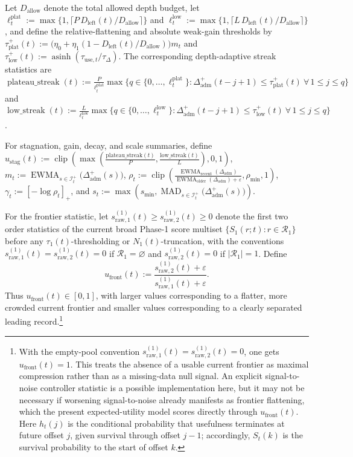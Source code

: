 \documentclass[11pt]{article}
\begin{document}
Let \(D_{\mathrm{allow}}\) denote the total allowed depth budget, let \(\ell_t^{\mathrm{plat}}:=\max\{1,\lceil P\,D_{\mathrm{left}}(t)/D_{\mathrm{allow}}\rceil\}\) and \(\ell_t^{\mathrm{low}}:=\max\{1,\lceil L\,D_{\mathrm{left}}(t)/D_{\mathrm{allow}}\rceil\}\), and define the relative-flattening and absolute weak-gain thresholds by \(\tau_{\mathrm{plat}}^{+}(t):=\bigl(\eta_0+\eta_1(1-D_{\mathrm{left}}(t)/D_{\mathrm{allow}})\bigr)m_t\) and \(\tau_{\mathrm{low}}^{+}(t):=\operatorname{asinh}(\tau_{\mathrm{use},t}/\tau_\Delta)\). The corresponding depth-adaptive streak statistics are \(\operatorname{plateau\_streak}(t):=\frac{P}{\ell_t^{\mathrm{plat}}}\max\{q\in\{0,\dots,\ell_t^{\mathrm{plat}}\}:\Delta_{\mathrm{adm}}^{+}(t-j+1)\le \tau_{\mathrm{plat}}^{+}(t)\ \forall\,1\le j\le q\}\) and \(\operatorname{low\_streak}(t):=\frac{L}{\ell_t^{\mathrm{low}}}\max\{q\in\{0,\dots,\ell_t^{\mathrm{low}}\}:\Delta_{\mathrm{adm}}^{+}(t-j+1)\le \tau_{\mathrm{low}}^{+}(t)\ \forall\,1\le j\le q\}\).

For stagnation, gain, decay, and scale summaries, define \(u_{\mathrm{stag}}(t):=\operatorname{clip}\!\left(\max\!\left(\frac{\mathrm{plateau\_streak}(t)}{P},\frac{\mathrm{low\_streak}(t)}{L}\right),0,1\right)\), \(m_t:=\operatorname{EWMA}_{s\in\mathcal I_t^+}\!\bigl(\Delta_{\mathrm{adm}}^{+}(s)\bigr)\), \(\rho_t:=\operatorname{clip}\!\left(\frac{\operatorname{EWMA}_{\mathrm{recent}}(\Delta_{\mathrm{adm}})}{\operatorname{EWMA}_{\mathrm{older}}(\Delta_{\mathrm{adm}})+\varepsilon},\rho_{\min},1\right)\), \(\gamma_t:=[-\log\rho_t]_+\), and \(s_t:=\max\!\left(s_{\min},\operatorname{MAD}_{s\in\mathcal I_t^+}\!\bigl(\Delta_{\mathrm{adm}}^{+}(s)\bigr)\right)\).

For the frontier statistic, let \(s_{\mathrm{raw},1}^{(1)}(t)\ge s_{\mathrm{raw},2}^{(1)}(t)\ge 0\) denote the first two order statistics of the current broad Phase-1 score multiset \(\{S_1(r;t):r\in\mathcal R_1\}\) before any \(\tau_1(t)\)-thresholding or \(N_1(t)\)-truncation, with the conventions \(s_{\mathrm{raw},1}^{(1)}(t)=s_{\mathrm{raw},2}^{(1)}(t)=0\) if \(\mathcal R_1=\varnothing\) and \(s_{\mathrm{raw},2}^{(1)}(t)=0\) if \(|\mathcal R_1|=1\). Define
\[
u_{\mathrm{front}}(t)
:=
\frac{s_{\mathrm{raw},2}^{(1)}(t)+\varepsilon}{s_{\mathrm{raw},1}^{(1)}(t)+\varepsilon}.
\]
Thus \(u_{\mathrm{front}}(t)\in[0,1]\), with larger values corresponding to a flatter, more crowded current frontier and smaller values corresponding to a clearly separated leading record.\footnote{With the empty-pool convention \(s_{\mathrm{raw},1}^{(1)}(t)=s_{\mathrm{raw},2}^{(1)}(t)=0\), one gets \(u_{\mathrm{front}}(t)=1\). This treats the absence of a usable current frontier as maximal compression rather than as a missing-data null signal. An explicit signal-to-noise controller statistic is a possible implementation here, but it may not be necessary if worsening signal-to-noise already manifests as frontier flattening, which the present expected-utility model scores directly through \(u_{\mathrm{front}}(t)\). Here \(h_t(j)\) is the conditional probability that usefulness terminates at future offset \(j\), given survival through offset \(j-1\); accordingly, \(S_t(k)\) is the survival probability to the start of offset \(k\).}
\end{document}
